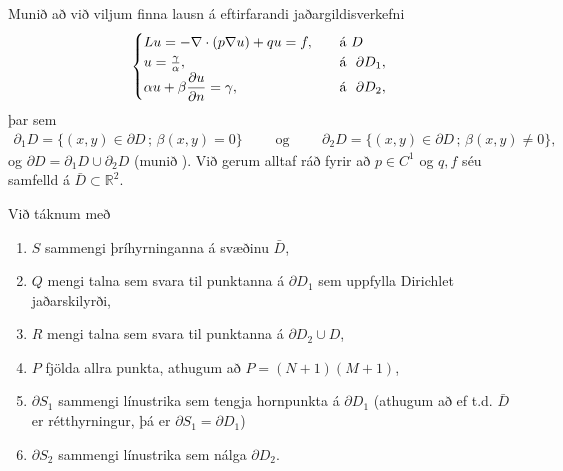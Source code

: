 \documentclass[a4paper,10pt,icelandic]{sphinxmanual}
\begin{document}
Munið að við viljum finna lausn á eftirfarandi jaðargildisverkefni
\begin{equation*}
\begin{split}\begin{cases}
Lu=-\nabla\cdot (p\nabla u)+qu=f, \quad &\text{á } D\\
u={\gamma\over \alpha},\quad &\text{á } \ \partial D_1,\\
\alpha u+\beta\dfrac{\partial u}{\partial n}
=\gamma, \quad  &\text{á } \ \partial D_2,
\end{cases}\end{split}
\end{equation*}
þar sem
\begin{equation*}
\begin{split}\partial_1D=\{(x,y)\in \partial D\,;\, \beta(x,y)=0\}
\qquad \text{ og } \qquad
\partial_2D=\{(x,y)\in \partial D\,;\, \beta(x,y)\neq 0\},\end{split}
\end{equation*}
og \(\partial D=\partial_1D\cup \partial_2 D\) (munið ). Við gerum alltaf ráð fyrir að \(p\in C^1\) og \(q, f\) séu samfelld á \(\bar D\subset\mathbb{R}^2\).

Við táknum með
\begin{enumerate}
\def\theenumi{\arabic{enumi}}
\def\labelenumi{\theenumi .}
\makeatletter\def\p@enumii{\p@enumi \theenumi .}\makeatother
\item {} 
\(S\) sammengi þríhyrninganna á svæðinu \(\bar D\),

\item {} 
\(Q\) mengi talna sem svara til punktanna á \(\partial D_1\) sem uppfylla Dirichlet jaðarskilyrði,

\item {} 
\(R\) mengi talna sem svara til punktanna á \(\partial D_2 \cup D\),

\item {} 
\(P\) fjölda allra punkta, athugum að \(P=(N+1)(M+1)\),

\item {} 
\(\partial S_1\) sammengi línustrika sem tengja hornpunkta á \(\partial D_1\) (athugum að ef t.d. \(\bar D\) er rétthyrningur, þá er \(\partial S_1=\partial D_1\))

\item {} 
\(\partial S_2\) sammengi línustrika sem nálga \(\partial D_2\).

\end{enumerate}
\end{document}
